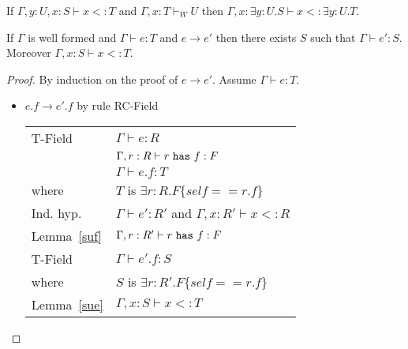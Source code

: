 \begin{lem}\label{sud}
If $\Gamma,y:U,x:S\vdash x<:T$ and $\Gamma,x:T\vdash_W U$ then $\Gamma, x:\exists y:U.S\vdash x<:\exists y:U.T$.
\end{lem}


\begin{thm}\label{sr}
If $\Gamma$ is well formed and $\Gamma\vdash e:T$ and $e\rightarrow e'$ then there exists $S$ such that $\Gamma\vdash e':S$. Moreover $\Gamma,x:S\vdash x<:T$.
\end{thm}

\begin{proof}
By induction on the proof of $e\rightarrow e'$. Assume $\Gamma\vdash e:T$.

\begin{itemize}


\item $e.f \rightarrow e'.f$ by rule {\sc RC-Field}
\\
\begin{tabular}{ll}
{\sc T-Field} & $\Gamma\vdash e:R$
\\
& $\Gamma,r:R\vdash r~{\tt has}~f:F$
\\
& $\Gamma\vdash e.f:T$
\\
where & $T$ is $\exists r:R.F\{self==r.f\}$
\\
Ind. hyp. & $\Gamma\vdash e':R'$ and $\Gamma,x:R'\vdash x<:R$
\\
Lemma~\ref{suf} & $\Gamma,r:R'\vdash r~{\tt has}~f:F$
\\
{\sc T-Field} & $\Gamma\vdash e'.f:S$
\\
where & $S$ is $\exists r:R'.F\{self==r.f\}$
\\
Lemma~\ref{sue} & $\Gamma,x:S\vdash x<:T$
\end{tabular}



\end{itemize}
\end{proof}
